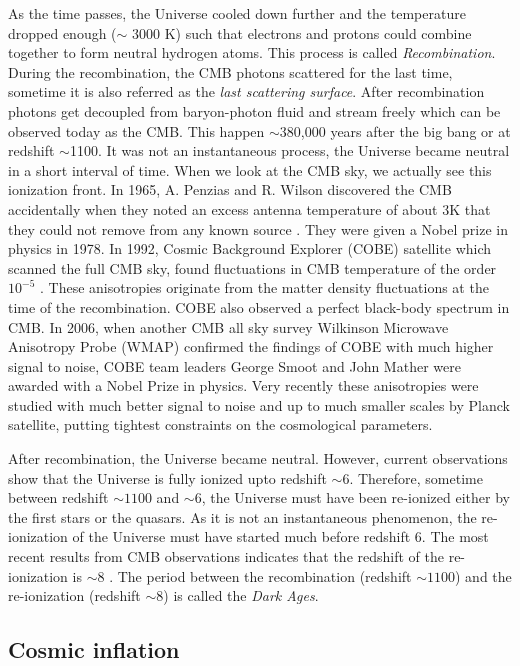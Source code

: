 As the time passes, the Universe cooled down further and the temperature
dropped enough ($\sim$ 3000 K) such that electrons and protons could combine 
together to form neutral hydrogen
atoms. This process is called {\it Recombination}. During the recombination,
the CMB photons scattered for the last time, sometime it is also referred
as the {\it last scattering surface}. After recombination photons 
get decoupled from baryon-photon fluid and stream freely which
can be observed today as the CMB. 
This happen $\sim$380,000 years after the big bang or at redshift 
$\sim$1100. It was not an instantaneous process, the Universe became neutral in a short interval of time. When we look at the CMB sky, we actually see
this ionization front. In 1965, A. Penzias and R. Wilson discovered the CMB
accidentally when they noted an excess antenna temperature of about 3K that
they could not remove from any known source \citep{2006astro.ph..1514F}. 
They were given a Nobel prize in 
physics in 1978. In 1992, Cosmic Background Explorer (COBE) satellite which
scanned the full CMB sky, found fluctuations in CMB temperature of the 
order $10^{-5}$ \citep{1996ApJ...473..576F,1999AIPC..476....1S}. 
These anisotropies originate from the matter density
fluctuations at the time of the recombination. COBE also observed a perfect
black-body spectrum in CMB. In 2006, when another CMB all sky survey 
Wilkinson Microwave Anisotropy Probe (WMAP) \citep{2006PThPS.163..185K} 
confirmed the findings of COBE
with much higher signal to noise, COBE team leaders George Smoot and John Mather
were awarded with a Nobel Prize in physics. Very recently these anisotropies were studied
with much better signal to noise and up to much smaller scales by Planck satellite, 
putting tightest constraints on the cosmological parameters.

After recombination, the Universe became neutral. However, current observations
show that the Universe is fully ionized upto redshift $\sim 6$. Therefore, 
sometime between redshift $\sim 1100$ and $\sim 6$, the Universe must have been
re-ionized either by the first stars or the quasars. As it is not an 
instantaneous phenomenon, the re-ionization of the Universe must have
started much before redshift $6$. The most recent results from
CMB observations indicates that the redshift of the re-ionization is
$\sim 8$ \citep{2015arXiv150201589P}. 
The period between the recombination (redshift $\sim 1100$)
and the re-ionization (redshift $\sim 8$) is called the {\it Dark Ages}.


\subsection{Cosmic inflation}

